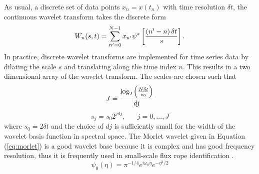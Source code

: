 As usual, a discrete set of data points $x_n=x(t_n)$ with time resolution $\delta t$, the continuous wavelet transform takes the discrete form
\begin{equation}
    W_n(s,t) = \sum_{n'=0}^{N-1}x_{n'}\psi^*\left[ \frac{\left( n'-n \right)\delta t}{s} \right].
    \label{eq:wavetrans2}
\end{equation}
In practice, discrete wavelet transforms are implemented for time series data by dilating the scale $s$ and translating along the time index $n$. This results in a two dimensional array of the wavelet transform. The scales are chosen such that
\begin{equation}
    J = \frac{\log_2\left( \frac{N \delta t}{s_0} \right)}{dj}
\end{equation}
\begin{equation}
    s_j = s_0 2^{j dj},\hspace{20pt} j = 0,...,J
    \label{eq:scales}
\end{equation}
where $s_0 = 2\delta t$ and the choice of $dj$ is sufficiently small for the width of the wavelet basis function in spectral space. The Morlet wavelet given in Equation (\ref{eq:morlet}) is a good wavelet base because it is complex and has good frequency resolution, thus it is frequently used in small-scale flux rope identification \citep{Telloni:2012, Telloni:2013, Zhao:2020}.
\begin{equation}
    \psi_0(\eta) = \pi^{-1/4}e^{i\omega_0\eta}e^{-\eta^2/2}
    \label{eq:morlet}
\end{equation}




